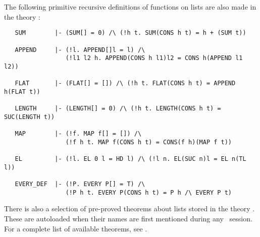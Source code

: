 \noindent The following primitive recursive definitions of functions on lists
are also made in the theory :


\begin{hol}

\begin{verbatim}
   SUM        |- (SUM[] = 0) /\ (!h t. SUM(CONS h t) = h + (SUM t))

   APPEND     |- (!l. APPEND[]l = l) /\
                 (!l1 l2 h. APPEND(CONS h l1)l2 = CONS h(APPEND l1 l2))

   FLAT       |- (FLAT[] = []) /\ (!h t. FLAT(CONS h t) = APPEND h(FLAT t))

   LENGTH     |- (LENGTH[] = 0) /\ (!h t. LENGTH(CONS h t) = SUC(LENGTH t))

   MAP        |- (!f. MAP f[] = []) /\
                 (!f h t. MAP f(CONS h t) = CONS(f h)(MAP f t))

   EL         |- (!l. EL 0 l = HD l) /\ (!l n. EL(SUC n)l = EL n(TL l))

   EVERY_DEF  |- (!P. EVERY P[] = T) /\
                 (!P h t. EVERY P(CONS h t) = P h /\ EVERY P t)
\end{verbatim}\end{hol}

\noindent There is also a selection of pre-proved theorems about lists stored
in the theory \ml{list}. These are autoloaded when their names are first
mentioned during any \HOL\ session. For a complete list of available theorems,
see \REFERENCE.

